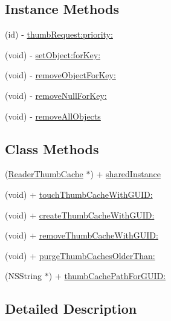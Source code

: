 \subsection*{Instance Methods}
\begin{DoxyCompactItemize}
\item 
(id) -\/ \hyperlink{interface_reader_thumb_cache_a4471faa4bdb367b02aeed4da49af7e4b}{thumb\-Request\-:priority\-:}
\item 
(void) -\/ \hyperlink{interface_reader_thumb_cache_abc66626fe85d5be6439e98eae9c22aa0}{set\-Object\-:for\-Key\-:}
\item 
(void) -\/ \hyperlink{interface_reader_thumb_cache_aea324161bd15fe1a1f1d7f4661b40172}{remove\-Object\-For\-Key\-:}
\item 
(void) -\/ \hyperlink{interface_reader_thumb_cache_a83f2dc15c3ae0f6dc0726066094d8283}{remove\-Null\-For\-Key\-:}
\item 
(void) -\/ \hyperlink{interface_reader_thumb_cache_a3a51b33b92b870172efe75752ced325b}{remove\-All\-Objects}
\end{DoxyCompactItemize}
\subsection*{Class Methods}
\begin{DoxyCompactItemize}
\item 
(\hyperlink{interface_reader_thumb_cache}{Reader\-Thumb\-Cache} $\ast$) + \hyperlink{interface_reader_thumb_cache_a5254f54ac18877ab24f532abedf47e6e}{shared\-Instance}
\item 
(void) + \hyperlink{interface_reader_thumb_cache_aa3c0deaeeed2095eba99fb8adae05acf}{touch\-Thumb\-Cache\-With\-G\-U\-I\-D\-:}
\item 
(void) + \hyperlink{interface_reader_thumb_cache_a30c4fab0b30c0ced09dc1c47f9f2788a}{create\-Thumb\-Cache\-With\-G\-U\-I\-D\-:}
\item 
(void) + \hyperlink{interface_reader_thumb_cache_a1cad6b7316810dafbcbf4a3a075897d6}{remove\-Thumb\-Cache\-With\-G\-U\-I\-D\-:}
\item 
(void) + \hyperlink{interface_reader_thumb_cache_ad540c117c74fa55f0f16472245fccf0b}{purge\-Thumb\-Caches\-Older\-Than\-:}
\item 
(N\-S\-String $\ast$) + \hyperlink{interface_reader_thumb_cache_a612df97f8366c742529535f6d6e88fe0}{thumb\-Cache\-Path\-For\-G\-U\-I\-D\-:}
\end{DoxyCompactItemize}


\subsection{Detailed Description}


